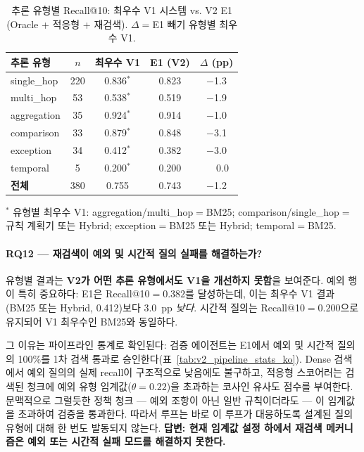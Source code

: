 \begin{table}[htbp]
\centering
\caption{추론 유형별 Recall@10: 최우수 V1 시스템 vs. V2 E1 (Oracle + 적응형 + 재검색). $\Delta{=}$E1 빼기 유형별 최우수 V1.}
\label{tab:v2_by_type_ko}
\begin{tabular}{lcccc}
\toprule
\textbf{추론 유형} & \textbf{$n$} & \textbf{최우수 V1} & \textbf{E1 (V2)} & \textbf{$\Delta$ (pp)} \\
\midrule
single\_hop    & 220 & 0.836$^*$ & 0.823 & $-$1.3 \\
multi\_hop     & 53  & 0.538$^*$ & 0.519 & $-$1.9 \\
aggregation    & 35  & 0.924$^*$ & 0.914 & $-$1.0 \\
comparison     & 33  & 0.879$^*$ & 0.848 & $-$3.1 \\
exception      & 34  & 0.412$^*$ & 0.382 & $-$3.0 \\
temporal       & 5   & 0.200$^*$ & 0.200 & $\phantom{-}$0.0 \\
\midrule
\textbf{전체}  & 380 & 0.755 & 0.743 & $-$1.2 \\
\bottomrule
\end{tabular}
{\footnotesize $^*$ 유형별 최우수 V1: aggregation/multi\_hop$=$BM25; comparison/single\_hop$=$규칙 계획기 또는 Hybrid; exception$=$BM25 또는 Hybrid; temporal$=$BM25.}
\end{table}

\FloatBarrier

\paragraph{RQ12 --- 재검색이 예외 및 시간적 질의 실패를 해결하는가?}

유형별 결과는 \textbf{V2가 어떤 추론 유형에서도 V1을 개선하지 못함}을 보여준다. 예외 행이 특히 중요하다: E1은 Recall@10$={0.382}$를 달성하는데, 이는 최우수 V1 결과(BM25 또는 Hybrid, 0.412)보다 3.0~pp \emph{낮다}. 시간적 질의는 Recall@10$={0.200}$으로 유지되어 V1 최우수인 BM25와 동일하다.

그 이유는 파이프라인 통계로 확인된다: 검증 에이전트는 E1에서 예외 및 시간적 질의의 100\%를 1차 검색 통과로 승인한다(표~\ref{tab:v2_pipeline_stats_ko}). Dense 검색에서 예외 질의의 실제 recall이 구조적으로 낮음에도 불구하고, 적응형 스코어러는 검색된 청크에 예외 유형 임계값($\theta=0.22$)을 초과하는 코사인 유사도 점수를 부여한다. 문맥적으로 그럴듯한 정책 청크 --- 예외 조항이 아닌 일반 규칙이더라도 --- 이 임계값을 초과하여 검증을 통과한다. 따라서 루프는 바로 이 루프가 대응하도록 설계된 질의 유형에 대해 한 번도 발동되지 않는다. \textbf{답변: 현재 임계값 설정 하에서 재검색 메커니즘은 예외 또는 시간적 실패 모드를 해결하지 못한다.}

